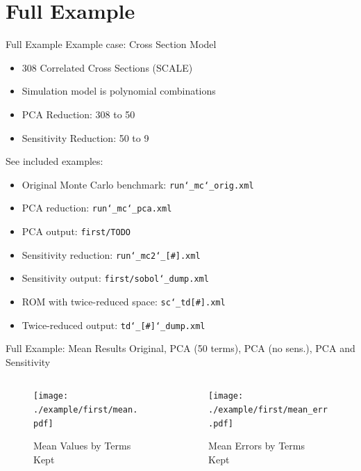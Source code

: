 \documentclass[t,9pt,svgnames]{beamer}
\newcommand{\code}[1]{\texttt{#1}}
\begin{document}
\section{Full Example}
\begin{frame}[fragile]{Full Example}
  \vfill
  Example case: Cross Section Model
  \vfill
  \begin{itemize}
    \item 308 Correlated Cross Sections (SCALE)
  \vfill
    \item Simulation model is polynomial combinations
  \vfill
    \item PCA Reduction: 308 to 50
  \vfill
    \item Sensitivity Reduction: 50 to 9
  \end{itemize}
  \vfill
  See included examples:
  \vfill
  \begin{itemize}
    \item Original Monte Carlo benchmark: \code{run\char`_mc\char`_orig.xml}
  \vfill
    \item PCA reduction: \code{run\char`_mc\char`_pca.xml}
  \vfill
    \item PCA output: \code{first/TODO}
  \vfill
    \item Sensitivity reduction: \code{run\char`_mc2\char`_[\#].xml}
  \vfill
    \item Sensitivity output: \code{first/sobol\char`_dump.xml}
  \vfill
    \item ROM with twice-reduced space: \code{sc\char`_td[\#].xml}
  \vfill
    \item Twice-reduced output: \code{td\char`_[\#]\char`_dump.xml}
  \end{itemize}
  \vfill
\end{frame}

\begin{frame}[fragile]{Full Example: Mean Results}
  \color{black} Original,
  \color{blue} PCA (50 terms),
  \color{red} PCA (no sens.),
  \color{ForestGreen} PCA and Sensitivity
  \begin{columns}
    \begin{column}{0.5\textwidth}
      \begin{figure}
        \centering
        \texttt{[image: ./example/first/mean.pdf]}
        \caption{Mean Values by Terms Kept}
      \end{figure}
    \end{column}
    \begin{column}{0.5\textwidth}
      \begin{figure}
        \centering
        \texttt{[image: ./example/first/mean\_err.pdf]}
        \caption{Mean Errors by Terms Kept}
      \end{figure}
    \end{column}
  \end{columns}
\end{frame}
\end{document}
